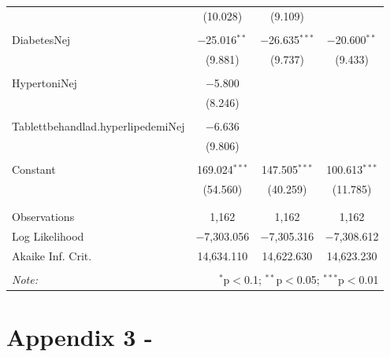 \begin{table}[!htbp]
\begin{tabular}{@{\extracolsep{5pt}}lccc}
  & (10.028) & (9.109) &  \\ 
  & & & \\ 
 DiabetesNej & $-$25.016$^{**}$ & $-$26.635$^{***}$ & $-$20.600$^{**}$ \\ 
  & (9.881) & (9.737) & (9.433) \\ 
  & & & \\ 
 HypertoniNej & $-$5.800 &  &  \\ 
  & (8.246) &  &  \\ 
  & & & \\ 
 Tablettbehandlad.hyperlipedemiNej & $-$6.636 &  &  \\ 
  & (9.806) &  &  \\ 
  & & & \\ 
 Constant & 169.024$^{***}$ & 147.505$^{***}$ & 100.613$^{***}$ \\ 
  & (54.560) & (40.259) & (11.785) \\ 
  & & & \\ 
\hline \\[-1.8ex] 
Observations & 1,162 & 1,162 & 1,162 \\ 
Log Likelihood & $-$7,303.056 & $-$7,305.316 & $-$7,308.612 \\ 
Akaike Inf. Crit. & 14,634.110 & 14,622.630 & 14,623.230 \\ 
\hline 
\hline \\[-1.8ex] 
\textit{Note:}  & \multicolumn{3}{r}{$^{*}$p$<$0.1; $^{**}$p$<$0.05; $^{***}$p$<$0.01} \\ 
\end{tabular} 
\end{table} 

\newpage
\section{Appendix 3 - }

